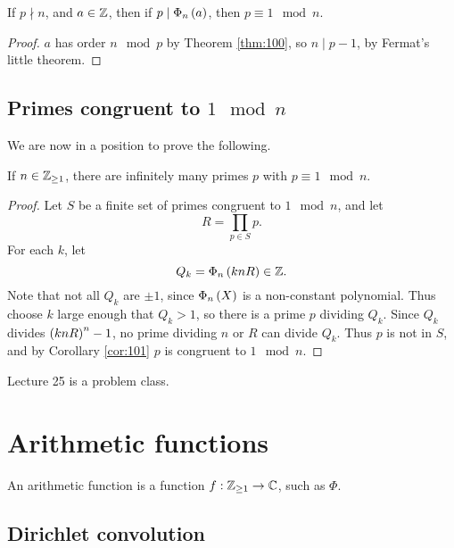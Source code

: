 \begin{corollary}
\label{cor:101}
If $ p \nmid n $, and $ a \in \mathbb{Z} $, then if $ p \mid \Phi_n\left( a \right) $, then $ p \equiv 1 \mod n $.
\end{corollary}

\begin{proof}
$ a $ has order $ n \mod p $ by Theorem \ref{thm:100}, so $ n \mid p - 1 $, by Fermat's little theorem.
\end{proof}

\subsection{Primes congruent to $ 1 \mod n $}

We are now in a position to prove the following.

\begin{theorem}
If $ n \in \mathbb{Z}_{\ge 1} $, there are infinitely many primes $ p $ with $ p \equiv 1 \mod n $.
\end{theorem}

\begin{proof}
Let $ S $ be a finite set of primes congruent to $ 1 \mod n $, and let
$$ R = \prod_{p \in S} p. $$
For each $ k $, let
$$ Q_k = \Phi_n\left( knR \right) \in \mathbb{Z}. $$
Note that not all $ Q_k $ are $ \pm 1 $, since $ \Phi_n\left( X \right) $ is a non-constant polynomial. Thus choose $ k $ large enough that $ Q_k > 1 $, so there is a prime $ p $ dividing $ Q_k $. Since $ Q_k $ divides $ \left( knR \right)^n - 1 $, no prime dividing $ n $ or $ R $ can divide $ Q_k $. Thus $ p $ is not in $ S $, and by Corollary \ref{cor:101} $ p $ is congruent to $ 1 \mod n $.
\end{proof}


Lecture 25 is a problem class.

\pagebreak

\section{Arithmetic functions}


An arithmetic function is a function $ f : \mathbb{Z}_{\ge 1} \to \mathbb{C} $, such as $ \Phi $.

\subsection{Dirichlet convolution}

